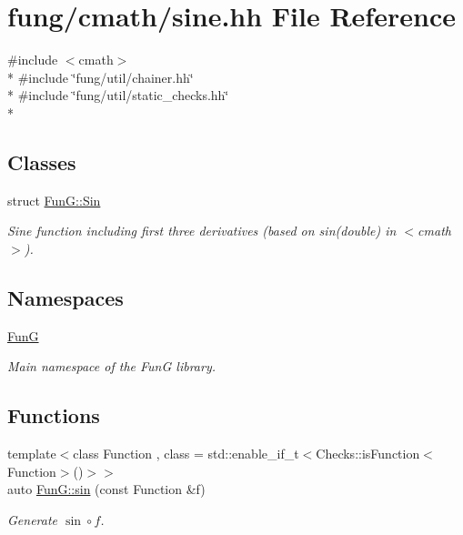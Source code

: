 \hypertarget{sine_8hh}{\section{fung/cmath/sine.hh File Reference}
\label{sine_8hh}
}
{\ttfamily \#include $<$cmath$>$}\\*
{\ttfamily \#include \char`\"{}fung/util/chainer.\-hh\char`\"{}}\\*
{\ttfamily \#include \char`\"{}fung/util/static\-\_\-checks.\-hh\char`\"{}}\\*
\subsection*{Classes}
\begin{DoxyCompactItemize}
\item 
struct \hyperlink{structFunG_1_1Sin}{Fun\-G\-::\-Sin}
\begin{DoxyCompactList}\small\item\em Sine function including first three derivatives (based on sin(double) in $<$cmath$>$). \end{DoxyCompactList}\end{DoxyCompactItemize}
\subsection*{Namespaces}
\begin{DoxyCompactItemize}
\item 
\hyperlink{namespaceFunG}{Fun\-G}
\begin{DoxyCompactList}\small\item\em Main namespace of the Fun\-G library. \end{DoxyCompactList}\end{DoxyCompactItemize}
\subsection*{Functions}
\begin{DoxyCompactItemize}
\item 
{\footnotesize template$<$class Function , class  = std\-::enable\-\_\-if\-\_\-t$<$\-Checks\-::is\-Function$<$\-Function$>$()$>$$>$ }\\auto \hyperlink{group__CMathGroup_ga663fdbe7a8977cba529c7c33981b7738}{Fun\-G\-::sin} (const Function \&f)
\begin{DoxyCompactList}\small\item\em Generate $ \sin\circ f $. \end{DoxyCompactList}\end{DoxyCompactItemize}
